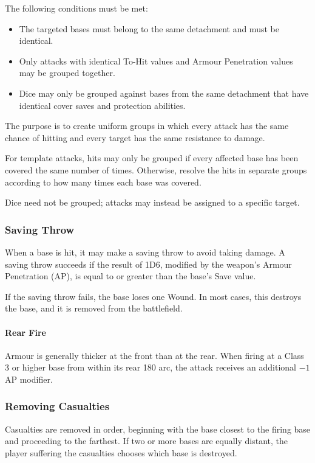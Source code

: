 The following conditions must be met:

\begin{itemize}
    \item The targeted bases must belong to the same detachment and must be identical.
    \item Only attacks with identical To-Hit values and Armour Penetration values may be grouped together.
    \item Dice may only be grouped against bases from the same detachment that have identical cover saves and protection abilities.
\end{itemize}

The purpose is to create uniform groups in which every attack has the same chance of hitting and every target has the same resistance to damage.

For template attacks, hits may only be grouped if every affected base has been covered the same number of times. Otherwise, resolve the hits in separate groups according to how many times each base was covered.

Dice need not be grouped; attacks may instead be assigned to a specific target.

\subsubsection{Saving Throw}

When a base is hit, it may make a saving throw to avoid taking damage. A saving throw succeeds if the result of 1D6, modified by the weapon's Armour Penetration (AP), is equal to or greater than the base's Save value.

If the saving throw fails, the base loses one Wound. In most cases, this destroys the base, and it is removed from the battlefield.

\paragraph{Rear Fire}

Armour is generally thicker at the front than at the rear. When firing at a Class 3 or higher base from within its rear 180\textdegree{} arc, the attack receives an additional $-1$ AP modifier.

\subsubsection{Removing Casualties}

Casualties are removed in order, beginning with the base closest to the firing base and proceeding to the farthest. If two or more bases are equally distant, the player suffering the casualties chooses which base is destroyed.

